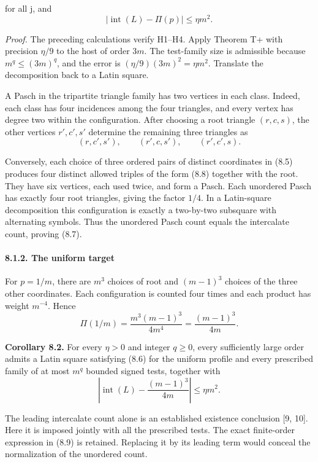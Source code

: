 \documentclass[english,11pt,a4paper]{article}
\begin{document}
for all j, and
\[|\operatorname{int}(L)-\Pi(p)|\leq\eta m^2.                         \tag{8.7}\]

\emph{Proof.} The preceding calculations verify H1--H4. Apply Theorem T+ with precision \(\eta/9\) to the host of order \(3m\). The test-family size is admissible because \(m^q\leq(3m)^q\), and the error is \((\eta/9)(3m)^2=\eta m^2\). Translate the decomposition back to a Latin square.

A Pasch in the tripartite triangle family has two vertices in each class. Indeed, each class has four incidences among the four triangles, and every vertex has degree two within the configuration. After choosing a root triangle \((r,c,s)\), the other vertices \(r',c',s'\) determine the remaining three triangles as
\[(r,c',s'),\qquad(r',c,s'),\qquad(r',c',s).                           \tag{8.8}\]

Conversely, each choice of three ordered pairs of distinct coordinates in (8.5) produces four distinct allowed triples of the form (8.8) together with the root. They have six vertices, each used twice, and form a Pasch. Each unordered Pasch has exactly four root triangles, giving the factor \(1/4\). In a Latin-square decomposition this configuration is exactly a two-by-two subsquare with alternating symbols. Thus the unordered Pasch count equals the intercalate count, proving (8.7).

\paragraph{8.1.2. The uniform target}\label{the-uniform-target}

For \(p=1/m\), there are \(m^3\) choices of root and \((m-1)^3\) choices of the three other coordinates. Each configuration is counted four times and each product has weight \(m^{-4}\). Hence
\[\Pi(1/m)=\frac{m^3(m-1)^3}{4m^4}
=\frac{(m-1)^3}{4m}.                                               \tag{8.9}\]

\textbf{Corollary 8.2.} For every \(\eta>0\) and integer \(q\geq0\), every sufficiently large order admits a Latin square satisfying (8.6) for the uniform profile and every prescribed family of at most \(m^q\) bounded signed tests, together with
\[\left|\operatorname{int}(L)-\frac{(m-1)^3}{4m}\right|
\leq\eta m^2.                                                       \tag{8.10}\]

The leading intercalate count alone is an established existence conclusion {[}9, 10{]}. Here it is imposed jointly with all the prescribed tests. The exact finite-order expression in (8.9) is retained. Replacing it by its leading term would conceal the normalization of the unordered count.
\end{document}
